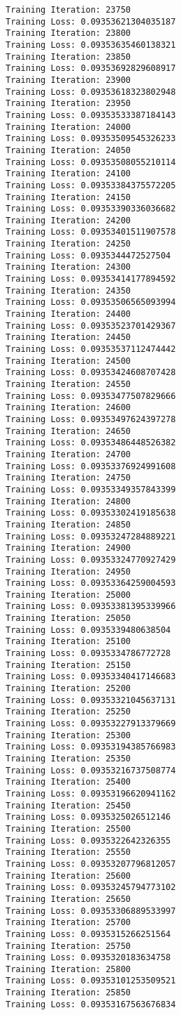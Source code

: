 \documentclass[11pt]{article}
\begin{document}
\begin{Verbatim}[commandchars=\\\{\}]
Training Iteration: 23750
Training Loss: 0.09353621304035187
Training Iteration: 23800
Training Loss: 0.09353635460138321
Training Iteration: 23850
Training Loss: 0.09353692829608917
Training Iteration: 23900
Training Loss: 0.09353618323802948
Training Iteration: 23950
Training Loss: 0.09353533387184143
Training Iteration: 24000
Training Loss: 0.09353509545326233
Training Iteration: 24050
Training Loss: 0.09353508055210114
Training Iteration: 24100
Training Loss: 0.09353384375572205
Training Iteration: 24150
Training Loss: 0.09353390336036682
Training Iteration: 24200
Training Loss: 0.09353401511907578
Training Iteration: 24250
Training Loss: 0.0935344472527504
Training Iteration: 24300
Training Loss: 0.09353414177894592
Training Iteration: 24350
Training Loss: 0.09353506565093994
Training Iteration: 24400
Training Loss: 0.09353523701429367
Training Iteration: 24450
Training Loss: 0.09353537112474442
Training Iteration: 24500
Training Loss: 0.09353424608707428
Training Iteration: 24550
Training Loss: 0.09353477507829666
Training Iteration: 24600
Training Loss: 0.09353497624397278
Training Iteration: 24650
Training Loss: 0.09353486448526382
Training Iteration: 24700
Training Loss: 0.09353376924991608
Training Iteration: 24750
Training Loss: 0.09353349357843399
Training Iteration: 24800
Training Loss: 0.09353302419185638
Training Iteration: 24850
Training Loss: 0.09353247284889221
Training Iteration: 24900
Training Loss: 0.09353324770927429
Training Iteration: 24950
Training Loss: 0.09353364259004593
Training Iteration: 25000
Training Loss: 0.09353381395339966
Training Iteration: 25050
Training Loss: 0.0935339480638504
Training Iteration: 25100
Training Loss: 0.0935334786772728
Training Iteration: 25150
Training Loss: 0.09353340417146683
Training Iteration: 25200
Training Loss: 0.09353321045637131
Training Iteration: 25250
Training Loss: 0.09353227913379669
Training Iteration: 25300
Training Loss: 0.09353194385766983
Training Iteration: 25350
Training Loss: 0.09353216737508774
Training Iteration: 25400
Training Loss: 0.09353196620941162
Training Iteration: 25450
Training Loss: 0.0935325026512146
Training Iteration: 25500
Training Loss: 0.0935322642326355
Training Iteration: 25550
Training Loss: 0.09353207796812057
Training Iteration: 25600
Training Loss: 0.09353245794773102
Training Iteration: 25650
Training Loss: 0.09353306889533997
Training Iteration: 25700
Training Loss: 0.0935315266251564
Training Iteration: 25750
Training Loss: 0.0935320183634758
Training Iteration: 25800
Training Loss: 0.09353101253509521
Training Iteration: 25850
Training Loss: 0.09353167563676834

\end{Verbatim}
\end{document}
